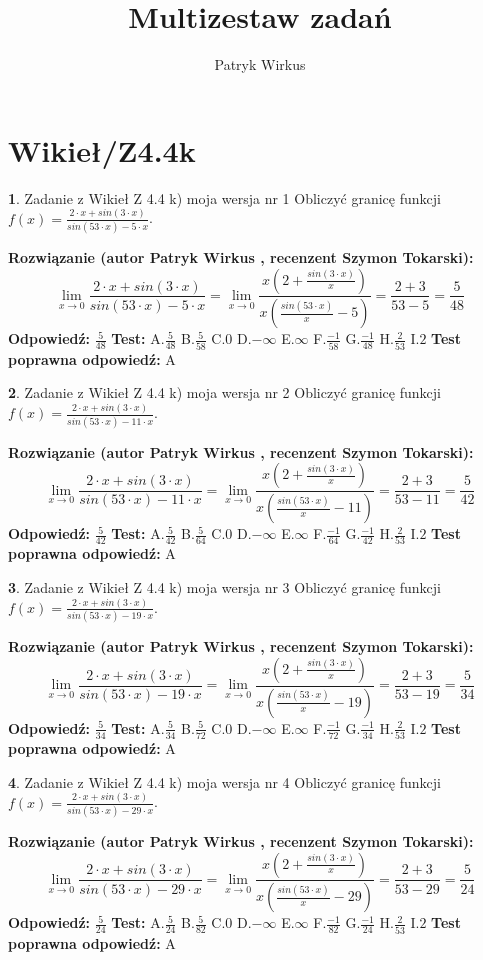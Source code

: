 \documentclass[12pt, a4paper]{article}
\title{Multizestaw zadań}
\author{Patryk Wirkus}
\date{}
\theoremstyle{definition} %
\newtheorem{zad}{}
\newcommand{\kategoria}[1]{\section{#1}}
\newcommand{\zadStart}[1]{\begin{zad}#1\newline}
\newcommand{\zadStop}{\end{zad}}
\newcommand{\rozwStart}[2]{\noindent \textbf{Rozwiązanie (autor #1 , recenzent #2): }\newline}
\newcommand{\rozwStop}{\newline}
\newcommand{\odpStart}{\noindent \textbf{Odpowiedź:}\newline}
\newcommand{\odpStop}{\newline}
\newcommand{\testStart}{\noindent \textbf{Test:}\newline}
\newcommand{\testStop}{\newline}
\newcommand{\kluczStart}{\noindent \textbf{Test poprawna odpowiedź:}\newline}
\newcommand{\kluczStop}{\newline}
\begin{document}
\maketitle

\kategoria{Wikieł/Z4.4k}


\zadStart{Zadanie z Wikieł Z 4.4 k) moja wersja nr 1}
Obliczyć granicę funkcji $f(x)=\frac{2\cdot x +sin(3\cdot x)}{sin(53\cdot x) -5\cdot x}$.
\zadStop
\rozwStart{Patryk Wirkus}{Szymon Tokarski}
$$\lim\limits_{x\to 0}\frac{2\cdot x +sin(3\cdot x)}{sin(53\cdot x) -5\cdot x}
=\lim\limits_{x\to 0}\frac{x(2+\frac{sin(3\cdot x)}{x})}{x(\frac{sin(53\cdot x)}{x}-5)}
=\frac{2+3}{53-5} = \frac{5}{48}$$
\rozwStop
\odpStart
$\frac{5}{48}$
\odpStop
\testStart
A.$\frac{5}{48}$
B.$\frac{5}{58}$
C.$0$
D.$-\infty$
E.$\infty$
F.$\frac{-1}{58}$
G.$\frac{-1}{48}$
H.$\frac{2}{53}$
I.$2$
\testStop
\kluczStart
A
\kluczStop



\zadStart{Zadanie z Wikieł Z 4.4 k) moja wersja nr 2}
Obliczyć granicę funkcji $f(x)=\frac{2\cdot x +sin(3\cdot x)}{sin(53\cdot x) -11\cdot x}$.
\zadStop
\rozwStart{Patryk Wirkus}{Szymon Tokarski}
$$\lim\limits_{x\to 0}\frac{2\cdot x +sin(3\cdot x)}{sin(53\cdot x) -11\cdot x}
=\lim\limits_{x\to 0}\frac{x(2+\frac{sin(3\cdot x)}{x})}{x(\frac{sin(53\cdot x)}{x}-11)}
=\frac{2+3}{53-11} = \frac{5}{42}$$
\rozwStop
\odpStart
$\frac{5}{42}$
\odpStop
\testStart
A.$\frac{5}{42}$
B.$\frac{5}{64}$
C.$0$
D.$-\infty$
E.$\infty$
F.$\frac{-1}{64}$
G.$\frac{-1}{42}$
H.$\frac{2}{53}$
I.$2$
\testStop
\kluczStart
A
\kluczStop



\zadStart{Zadanie z Wikieł Z 4.4 k) moja wersja nr 3}
Obliczyć granicę funkcji $f(x)=\frac{2\cdot x +sin(3\cdot x)}{sin(53\cdot x) -19\cdot x}$.
\zadStop
\rozwStart{Patryk Wirkus}{Szymon Tokarski}
$$\lim\limits_{x\to 0}\frac{2\cdot x +sin(3\cdot x)}{sin(53\cdot x) -19\cdot x}
=\lim\limits_{x\to 0}\frac{x(2+\frac{sin(3\cdot x)}{x})}{x(\frac{sin(53\cdot x)}{x}-19)}
=\frac{2+3}{53-19} = \frac{5}{34}$$
\rozwStop
\odpStart
$\frac{5}{34}$
\odpStop
\testStart
A.$\frac{5}{34}$
B.$\frac{5}{72}$
C.$0$
D.$-\infty$
E.$\infty$
F.$\frac{-1}{72}$
G.$\frac{-1}{34}$
H.$\frac{2}{53}$
I.$2$
\testStop
\kluczStart
A
\kluczStop



\zadStart{Zadanie z Wikieł Z 4.4 k) moja wersja nr 4}
Obliczyć granicę funkcji $f(x)=\frac{2\cdot x +sin(3\cdot x)}{sin(53\cdot x) -29\cdot x}$.
\zadStop
\rozwStart{Patryk Wirkus}{Szymon Tokarski}
$$\lim\limits_{x\to 0}\frac{2\cdot x +sin(3\cdot x)}{sin(53\cdot x) -29\cdot x}
=\lim\limits_{x\to 0}\frac{x(2+\frac{sin(3\cdot x)}{x})}{x(\frac{sin(53\cdot x)}{x}-29)}
=\frac{2+3}{53-29} = \frac{5}{24}$$
\rozwStop
\odpStart
$\frac{5}{24}$
\odpStop
\testStart
A.$\frac{5}{24}$
B.$\frac{5}{82}$
C.$0$
D.$-\infty$
E.$\infty$
F.$\frac{-1}{82}$
G.$\frac{-1}{24}$
H.$\frac{2}{53}$
I.$2$
\testStop
\kluczStart
A
\kluczStop
\end{document}
